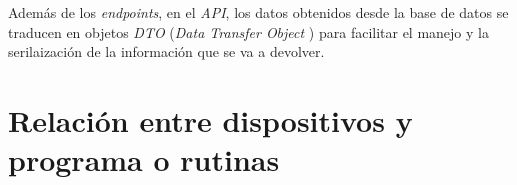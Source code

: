 \documentclass[12pt,a4paper,titlepage]{article}
\begin{document}
    Además de los \textit{endpoints}, en el \textit{API}, los datos obtenidos desde la base de datos se traducen en objetos \textit{DTO} (\textit{Data Transfer Object} \cite{wiki:dto}) para facilitar el manejo y la serilaización de la información que se va a devolver.

    







    \section{Relación entre dispositivos y programa o rutinas}


\end{document}
